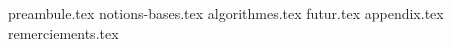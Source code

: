 {preambule.tex}
{notions-bases.tex}
{algorithmes.tex}
{futur.tex}
{appendix.tex}
{remerciements.tex}